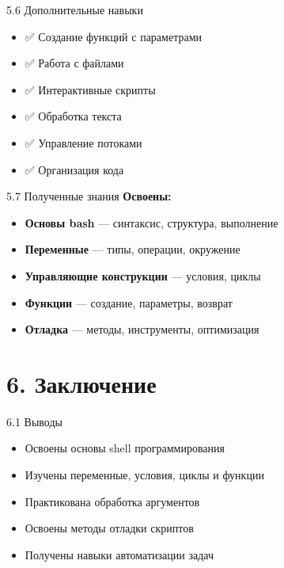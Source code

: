 \documentclass[
  ignorenonframetext,
  aspectratio=169,
  russian,
]{beamer}
\providecommand{\tightlist}{%
  \setlength{\itemsep}{0pt}\setlength{\parskip}{0pt}}
\begin{document}
\begin{frame}{5.6 Дополнительные навыки}
\label{ux434ux43eux43fux43eux43bux43dux438ux442ux435ux43bux44cux43dux44bux435-ux43dux430ux432ux44bux43aux438}
\begin{itemize}[<+->]
\tightlist
\item
  ✅ Создание функций с параметрами
\item
  ✅ Работа с файлами
\item
  ✅ Интерактивные скрипты
\item
  ✅ Обработка текста
\item
  ✅ Управление потоками
\item
  ✅ Организация кода
\end{itemize}
\end{frame}

\begin{frame}{5.7 Полученные знания}
\label{ux43fux43eux43bux443ux447ux435ux43dux43dux44bux435-ux437ux43dux430ux43dux438ux44f}
\textbf{Освоены:}

\begin{itemize}[<+->]
\tightlist
\item
  \textbf{Основы bash} --- синтаксис, структура, выполнение
\item
  \textbf{Переменные} --- типы, операции, окружение
\item
  \textbf{Управляющие конструкции} --- условия, циклы
\item
  \textbf{Функции} --- создание, параметры, возврат
\item
  \textbf{Отладка} --- методы, инструменты, оптимизация
\end{itemize}
\end{frame}

\section{6. Заключение}\label{ux437ux430ux43aux43bux44eux447ux435ux43dux438ux435}

\begin{frame}{6.1 Выводы}
\label{ux432ux44bux432ux43eux434ux44b}
\begin{itemize}[<+->]
\tightlist
\item
  Освоены основы shell программирования
\item
  Изучены переменные, условия, циклы и функции
\item
  Практикована обработка аргументов
\item
  Освоены методы отладки скриптов
\item
  Получены навыки автоматизации задач
\end{itemize}
\end{frame}
\end{document}
